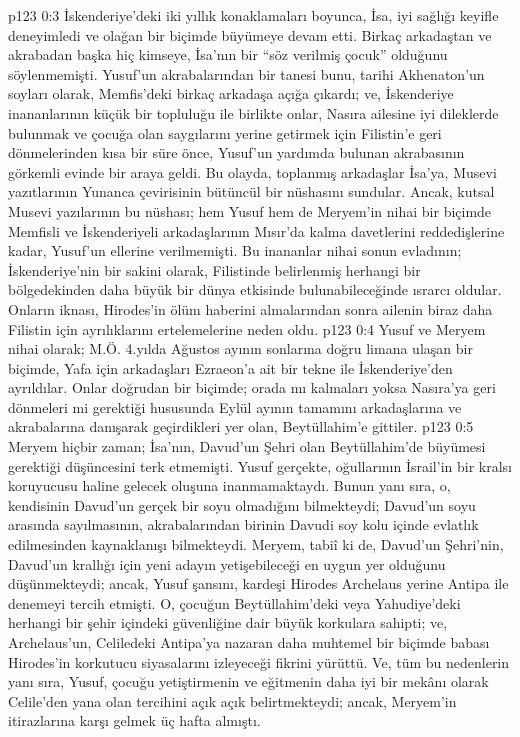 \vs p123 0:3 İskenderiye’deki iki yıllık konaklamaları boyunca, İsa, iyi sağlığı keyifle deneyimledi ve olağan bir biçimde büyümeye devam etti. Birkaç arkadaştan ve akrabadan başka hiç kimseye, İsa’nın bir “söz verilmiş çocuk” olduğunu söylenmemişti. Yusuf’un akrabalarından bir tanesi bunu, tarihi Akhenaton’un soyları olarak, Memfis’deki birkaç arkadaşa açığa çıkardı; ve, İskenderiye inananlarının küçük bir topluluğu ile birlikte onlar, Nasıra ailesine iyi dileklerde bulunmak ve çocuğa olan saygılarını yerine getirmek için Filistin’e geri dönmelerinden kısa bir süre önce, Yusuf’un yardımda bulunan akrabasının görkemli evinde bir araya geldi. Bu olayda, toplanmış arkadaşlar İsa’ya, Musevi yazıtlarının Yunanca çevirisinin bütüncül bir nüshasını sundular. Ancak, kutsal Musevi yazılarının bu nüshası; hem Yusuf hem de Meryem’in nihai bir biçimde Memfisli ve İskenderiyeli arkadaşlarının Mısır’da kalma davetlerini reddedişlerine kadar, Yusuf’un ellerine verilmemişti. Bu inananlar nihai sonun evladının; İskenderiye’nin bir sakini olarak, Filistinde belirlenmiş herhangi bir bölgedekinden daha büyük bir dünya etkisinde bulunabileceğinde ısrarcı oldular. Onların iknası, Hirodes’in ölüm haberini almalarından sonra ailenin biraz daha Filistin için ayrılıklarını ertelemelerine neden oldu.
\vs p123 0:4 Yusuf ve Meryem nihai olarak; M.Ö. 4.yılda Ağustos ayının sonlarına doğru limana ulaşan bir biçimde, Yafa için arkadaşları Ezraeon’a ait bir tekne ile İskenderiye’den ayrıldılar. Onlar doğrudan bir biçimde; orada mı kalmaları yoksa Nasıra’ya geri dönmeleri mi gerektiği hususunda Eylül ayının tamamını arkadaşlarına ve akrabalarına danışarak geçirdikleri yer olan, Beytüllahim’e gittiler.
\vs p123 0:5 Meryem hiçbir zaman; İsa’nın, Davud’un Şehri olan Beytüllahim’de büyümesi gerektiği düşüncesini terk etmemişti. Yusuf gerçekte, oğullarının İsrail’in bir kralsı koruyucusu haline gelecek oluşuna inanmamaktaydı. Bunun yanı sıra, o, kendisinin Davud’un gerçek bir soyu olmadığını bilmekteydi; Davud’un soyu arasında sayılmasının, akrabalarından birinin Davudi soy kolu içinde evlatlık edilmesinden kaynaklanışı bilmekteydi. Meryem, tabiî ki de, Davud’un Şehri’nin, Davud’un krallığı için yeni adayın yetişebileceği en uygun yer olduğunu düşünmekteydi; ancak, Yusuf şansını, kardeşi Hirodes Archelaus yerine Antipa ile denemeyi tercih etmişti. O, çocuğun Beytüllahim’deki veya Yahudiye’deki herhangi bir şehir içindeki güvenliğine dair büyük korkulara sahipti; ve, Archelaus’un, Celiledeki Antipa’ya nazaran daha muhtemel bir biçimde babası Hirodes’in korkutucu siyasalarını izleyeceği fikrini yürüttü. Ve, tüm bu nedenlerin yanı sıra, Yusuf, çocuğu yetiştirmenin ve eğitmenin daha iyi bir mekânı olarak Celile’den yana olan tercihini açık açık belirtmekteydi; ancak, Meryem’in itirazlarına karşı gelmek üç hafta almıştı.
